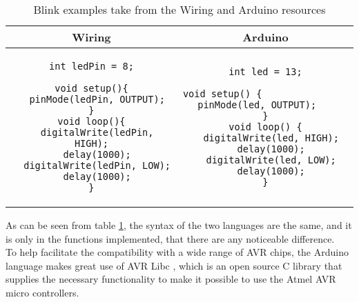 \begin{table}[H]
\centering
\begin{tabular}{cc}
Wiring 
& 
Arduino \\ 
\hline 
\begin{lstlisting}
int ledPin = 8;

void setup(){
  pinMode(ledPin, OUTPUT);
}
void loop(){
  digitalWrite(ledPin, HIGH);
  delay(1000);
  digitalWrite(ledPin, LOW);
  delay(1000);
}
\end{lstlisting}  
& 
\begin{lstlisting}
int led = 13;

void setup() {                
  pinMode(led, OUTPUT);     
}
void loop() {
  digitalWrite(led, HIGH);
  delay(1000);
  digitalWrite(led, LOW);
  delay(1000);
}
\end{lstlisting} 
\end{tabular} 
\caption{Blink examples take from the Wiring and Arduino resources}
\label{tabel:comparison}
\end{table}

As can be seen from table \ref{tabel:comparison}, the syntax of the two languages are the same, and it is only in the functions implemented, that there are any noticeable difference.\\ 
To help facilitate the compatibility with a wide range of AVR chips, the Arduino language makes great use of AVR Libc \cite{AVR:lib}, which is an open source C library that supplies the necessary functionality to make it possible to use the Atmel AVR micro controllers.